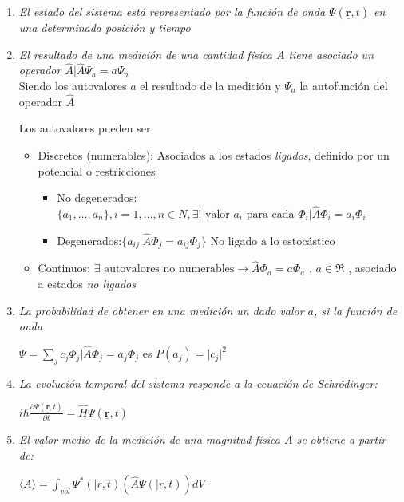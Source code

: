 \documentclass[oneside]{book}
\numberwithin{equation}{section}
\numberwithin{figure}{section}
\numberwithin{table}{section}
\newcommand{\vect}[1]{\underline{\textbf{#1}}}
\begin{document}
					\begin{enumerate}
						\item \emph{El estado del sistema está representado por la función de onda $\Psi(\vect{r},t)$ en una determinada posición y tiempo}
						\item \emph{El resultado de una medición de una cantidad física $A$ tiene asociado un operador $\hat{A} \vert \hat{A}\Psi_a=a\Psi_a$}\\
						
						Siendo los autovalores $a$ el resultado de la medición y $\Psi_a$ la autofunción del operador $\hat{A}$
						
						Los autovalores pueden ser:\\
						
						\begin{itemize}
							\item Discretos (numerables): Asociados a los estados \emph{ligados}, definido por un potencial o restricciones\\
								\begin{itemize}
									\item No degenerados:$\{a_1,\ldots,a_n\},i=1,\ldots,n \in N, \exists! \text{ valor } a_i \text{ para cada } \Phi_i \vert \hat{A}\Phi_i=a_i\Phi_i$
									\item Degenerados:$\{a_{ij} \vert \hat{A}\Phi_j=a_{ij}\Phi_j \} \text{ No ligado a lo estocástico}$
								\end{itemize}
							
							\item Continuos: $\exists \text{ autovalores no numerables} \longrightarrow \hat{A}\Phi_a=a\Phi_a \text{ , } a \in \Re$  , asociado a estados \emph{no ligados}
						\end{itemize}
						
						\item \emph{La probabilidad de obtener en una medición un dado valor $a$, si la función de onda}
						
							\begin{center}
								$\Psi=\sum_j c_j \Phi_j \vert \hat{A}\Phi_j=a_j \Phi_j$ es $P(a_j)=\vert c_j \vert^2$
							\end{center}						
						
						\item \emph{La evolución temporal del sistema responde a la ecuación de Schrödinger:}
						
							\begin{center}
								$i \hbar \frac{\partial \Psi(\vect{r},t)}{\partial t}=\hat{H} \Psi(\vect{r},t)$	
							\end{center}
							
						\item \emph{El valor medio de la medición de una magnitud física $A$ se obtiene a partir de:}
						
							\begin{center}
								$\langle A \rangle=\int_{vol} \Psi^* (\vert{r},t)\left(\hat{A} \Psi(\vert{r},t)\right) dV$
							\end{center}													
					\end{enumerate}									
				
\end{document}
